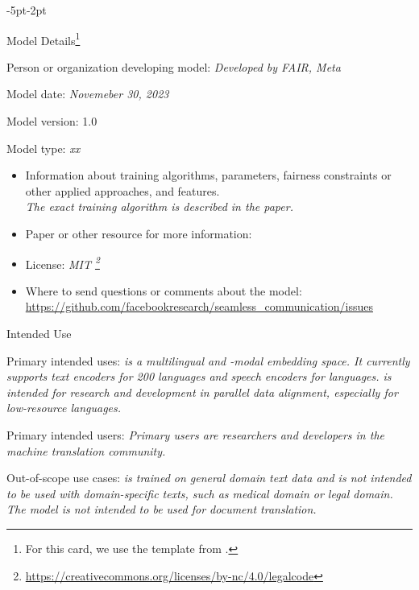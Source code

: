\newpage
\begin{adjustwidth}{-5pt}{-2pt}
\begin{singlespace}
\begin{tcolorbox}[title=\textbf{\section{Model Card - \sonar Speech Encoders}\label{card:sonar}},
    breakable, sharp corners, boxrule=0.5pt] 
\begin{mcsection}{Model Details\footnote{For this card, we use the template from \citet{10.1145/3287560.3287596}.}} 
\item Person or organization developing model: \textit{Developed by FAIR, Meta}
\item Model date: \textit{Novemeber 30, 2023}
\item Model version: 1.0
\item Model type: \textit{xx}
\begin{itemize}
    \item Information about training algorithms, parameters, fairness constraints or other applied approaches, and features.\\
    \textit{The exact training algorithm is described in the paper. }
    \item Paper or other resource for more information: \\
 \citet{Duquenne:2023:sonar_arxiv}
\item License: \textit{MIT
\footnote{\url{https://creativecommons.org/licenses/by-nc/4.0/legalcode}}}
\item Where to send questions or comments about the model: \\
\url{https://github.com/facebookresearch/seamless_communication/issues}
\end{itemize} 
\end{mcsection}


\begin{mcsection}{Intended Use}
    \item Primary intended uses: \textit{\sonar is a multilingual and -modal embedding space. It currently supports text encoders for 200 languages and speech encoders for \NbLangsMined languages. \sonar is intended for research and development in parallel data alignment, especially for low-resource languages.}
\item Primary intended users: \textit{Primary users are researchers and developers in the machine translation community. }
\item Out-of-scope use cases:
\textit{\sonar is trained on general domain text data and is not intended to be used with domain-specific texts, such as medical domain or legal domain. The model is not intended to be used for document translation.} 
\end{mcsection}


\end{tcolorbox}
\end{singlespace}
\end{adjustwidth}
